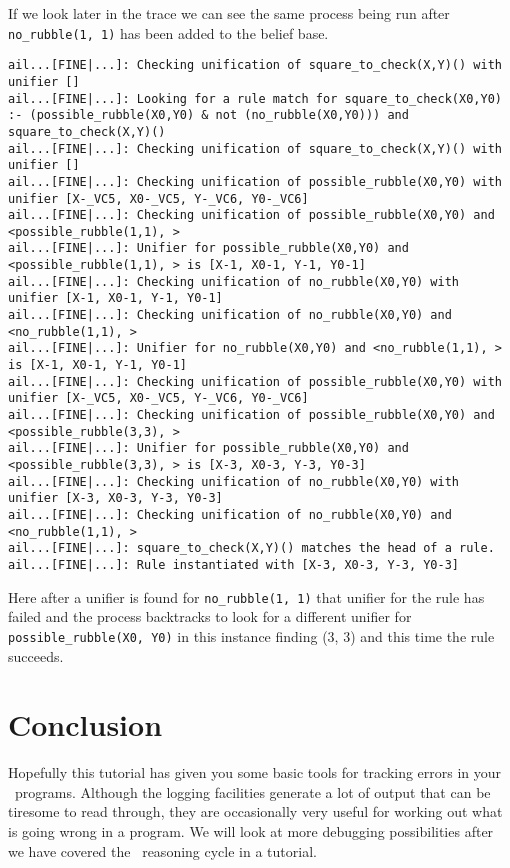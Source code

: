 If we look later in the trace we can see the same process being run
after \texttt{no\_rubble(1, 1)} has been added to the
belief base. 

\begin{verbatim}
ail...[FINE|...]: Checking unification of square_to_check(X,Y)() with unifier [] 
ail...[FINE|...]: Looking for a rule match for square_to_check(X0,Y0) :- (possible_rubble(X0,Y0) & not (no_rubble(X0,Y0))) and square_to_check(X,Y)() 
ail...[FINE|...]: Checking unification of square_to_check(X,Y)() with unifier [] 
ail...[FINE|...]: Checking unification of possible_rubble(X0,Y0) with unifier [X-_VC5, X0-_VC5, Y-_VC6, Y0-_VC6] 
ail...[FINE|...]: Checking unification of possible_rubble(X0,Y0) and <possible_rubble(1,1), > 
ail...[FINE|...]: Unifier for possible_rubble(X0,Y0) and <possible_rubble(1,1), > is [X-1, X0-1, Y-1, Y0-1] 
ail...[FINE|...]: Checking unification of no_rubble(X0,Y0) with unifier [X-1, X0-1, Y-1, Y0-1] 
ail...[FINE|...]: Checking unification of no_rubble(X0,Y0) and <no_rubble(1,1), > 
ail...[FINE|...]: Unifier for no_rubble(X0,Y0) and <no_rubble(1,1), > is [X-1, X0-1, Y-1, Y0-1] 
ail...[FINE|...]: Checking unification of possible_rubble(X0,Y0) with unifier [X-_VC5, X0-_VC5, Y-_VC6, Y0-_VC6] 
ail...[FINE|...]: Checking unification of possible_rubble(X0,Y0) and <possible_rubble(3,3), > 
ail...[FINE|...]: Unifier for possible_rubble(X0,Y0) and <possible_rubble(3,3), > is [X-3, X0-3, Y-3, Y0-3] 
ail...[FINE|...]: Checking unification of no_rubble(X0,Y0) with unifier [X-3, X0-3, Y-3, Y0-3] 
ail...[FINE|...]: Checking unification of no_rubble(X0,Y0) and <no_rubble(1,1), > 
ail...[FINE|...]: square_to_check(X,Y)() matches the head of a rule. 
ail...[FINE|...]: Rule instantiated with [X-3, X0-3, Y-3, Y0-3] 
\end{verbatim}
\begin{sloppypar}
Here after a unifier is found for \texttt{no\_rubble(1,
  1)} that unifier for the rule has failed and the process backtracks
to look for a different unifier for \texttt{possible\_rubble(X0, Y0)}
in this instance finding (3, 3) and this time the rule succeeds. 
\end{sloppypar}

\section{Conclusion}
Hopefully this tutorial has given you some basic tools for tracking
errors in your \gwendolen\ programs.  Although the logging facilities
generate a lot of output that can be tiresome to read through, they
are occasionally very useful for working out what is going wrong in a
program.  We will look at more debugging possibilities after we have
covered the \gwendolen\ reasoning cycle in a
tutorial. 

